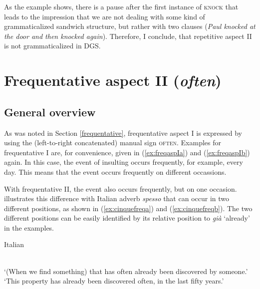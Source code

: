 \noindent As the example shows, there is a pause after the first instance of \textsc{knock} that leads to the impression that we are not dealing with some kind of grammaticalized sandwich structure, but rather with two clauses (\textit{Paul knocked at the door and then knocked again}). Therefore, I conclude, that repetitive aspect II is not grammaticalized in DGS.




\section{Frequentative aspect II (\textit{often})}\label{frequentatitivetwo}
\subsection{General overview}
As was noted in Section \ref{frequentative}, frequentative aspect I is expressed by using the (left-to-right concatenated) manual sign \textsc{often}. Examples for frequentative I are, for convenience, given in (\ref{ex:freqaspIa}) and (\ref{ex:freqaspIb}) again. In this case, the event of insulting occurs frequently, for example, every day. This means that the event occurs frequently on different occassions.

\begin{exe}
\ex\begin{xlist}
\end{xlist}
\end{exe}

\noindent With frequentative II, the event also occurs frequently, but on one occasion. \citet[92]{cinque1999adverbs} illustrates this difference with Italian adverb \textit{spesso} that can occur in two different positions, as shown in (\ref{ex:cinquefreqa}) and (\ref{ex:cinquefreqb}). The two different positions can be easily identified by its relative position to \textit{già} `already' in the examples.

\begin{exe}
\ex Italian \citep[92]{cinque1999adverbs}\begin{xlist}
 \\
`(When we find something) that has often already been discovered by someone.' \label{ex:cinquefreqa}
 \\
`This property has already been discovered often, in the last fifty years.' \label{ex:cinquefreqb}
\end{xlist}
\end{exe}


